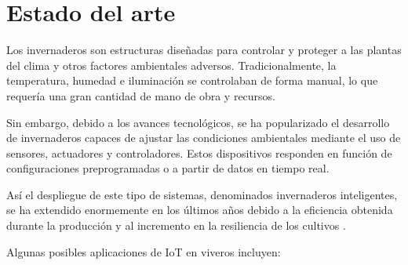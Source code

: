 



\section{Estado del arte}
\label{sec:Estado del arte}

Los invernaderos son estructuras diseñadas para controlar y proteger a las plantas del clima y otros factores ambientales adversos. Tradicionalmente, la temperatura, humedad e iluminación se controlaban de forma manual, lo que requería una gran cantidad de mano de obra y recursos. 

Sin embargo, debido a los avances tecnológicos, se ha popularizado el desarrollo de invernaderos capaces de ajustar las condiciones ambientales mediante el uso de sensores, actuadores y controladores. Estos dispositivos responden en función de configuraciones preprogramadas o a partir de datos en tiempo real.  

Así el despliegue de este tipo de sistemas, denominados invernaderos inteligentes, se ha extendido enormemente en los últimos años debido a la eficiencia obtenida durante la producción y al incremento en la resiliencia de los cultivos \citep{agrofacto}. 


Algunas posibles aplicaciones de IoT en viveros incluyen:

